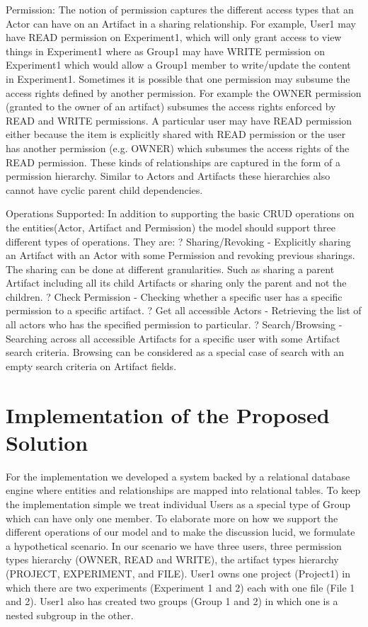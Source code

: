 \documentclass[sigconf]{acmart}
\begin{document}
Permission: The notion of permission captures the different access types that an Actor can have on an Artifact in a sharing relationship. For example, User1 may have READ permission on Experiment1, which will only grant access to view things in Experiment1 where as Group1 may have WRITE permission on Experiment1 which would allow a Group1 member to write/update the content in Experiment1. Sometimes it is possible that one permission may subsume the access rights defined by another permission. For example the OWNER permission (granted to the owner of an artifact) subsumes the access rights enforced by READ and WRITE permissions. A particular user may have READ permission either because the item is explicitly shared with READ permission or the user has another permission (e.g. OWNER) which subsumes the access rights of the READ permission. These kinds of relationships are captured in the form of a permission hierarchy. Similar to Actors and Artifacts these hierarchies also cannot have cyclic parent child dependencies.


Operations Supported:
	In addition to supporting the basic CRUD operations on the entities(Actor, Artifact and Permission) the model should support three different types of operations. They are:
?	Sharing/Revoking - Explicitly sharing an Artifact with an Actor with some Permission and revoking previous sharings. The sharing can be done at different granularities. Such as sharing a parent Artifact including all its child Artifacts or sharing only the parent and not the children.
?	Check Permission - Checking whether a specific user has a specific permission to a specific artifact.
?	Get all accessible Actors - Retrieving the list of all actors who has the specified permission to particular. 
?	Search/Browsing - Searching across all accessible Artifacts for a specific user with some Artifact search criteria. Browsing can be considered as a special case of search with an empty search criteria on Artifact fields.

\section{Implementation of the Proposed Solution}

For the implementation we developed a system backed by a relational database engine where entities and relationships are mapped into relational tables. To keep the implementation simple we treat individual Users as a special type of Group which can have only one member. To elaborate more on how we support the different operations of our model and to make the discussion lucid, we formulate a hypothetical scenario. In our scenario we have three users, three permission types hierarchy (OWNER, READ and WRITE), the artifact types hierarchy (PROJECT, EXPERIMENT, and FILE). User1 owns one project (Project1) in which there are two experiments (Experiment 1 and 2) each with one file (File 1 and 2). User1 also has created two groups (Group 1 and 2) in which one is a nested subgroup in the other.
\end{document}
